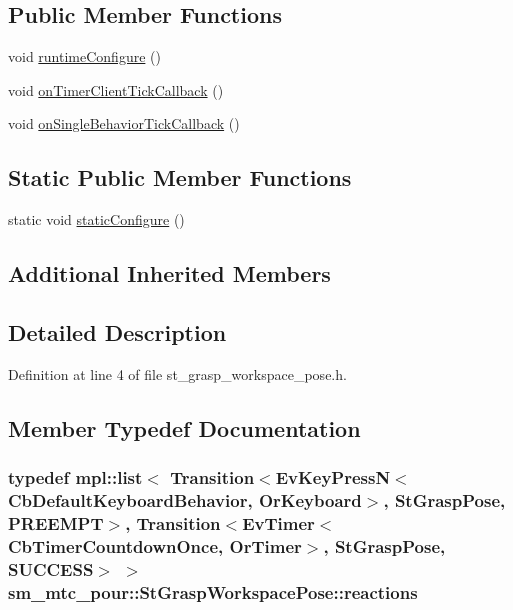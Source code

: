 \subsection*{Public Member Functions}
\begin{DoxyCompactItemize}
\item 
void \hyperlink{structsm__mtc__pour_1_1StGraspWorkspacePose_afcf41d71341af7a0c5382e2f5da3554a}{runtime\+Configure} ()
\item 
void \hyperlink{structsm__mtc__pour_1_1StGraspWorkspacePose_af10f597278e9e5afdeefd6f91d99d3ab}{on\+Timer\+Client\+Tick\+Callback} ()
\item 
void \hyperlink{structsm__mtc__pour_1_1StGraspWorkspacePose_a3cefea40047bb2ebcff455d2230485d4}{on\+Single\+Behavior\+Tick\+Callback} ()
\end{DoxyCompactItemize}
\subsection*{Static Public Member Functions}
\begin{DoxyCompactItemize}
\item 
static void \hyperlink{structsm__mtc__pour_1_1StGraspWorkspacePose_ae59939c0fb7a83119a13395fe2c81bd7}{static\+Configure} ()
\end{DoxyCompactItemize}
\subsection*{Additional Inherited Members}


\subsection{Detailed Description}


Definition at line 4 of file st\+\_\+grasp\+\_\+workspace\+\_\+pose.\+h.



\subsection{Member Typedef Documentation}
\subsubsection[{\texorpdfstring{reactions}{reactions}}]{\setlength{\rightskip}{0pt plus 5cm}typedef mpl\+::list$<$ Transition$<$Ev\+Key\+PressN$<$Cb\+Default\+Keyboard\+Behavior, {\bf Or\+Keyboard}$>$, {\bf St\+Grasp\+Pose}, {\bf P\+R\+E\+E\+M\+PT}$>$, Transition$<$Ev\+Timer$<$Cb\+Timer\+Countdown\+Once, {\bf Or\+Timer}$>$, {\bf St\+Grasp\+Pose}, {\bf S\+U\+C\+C\+E\+SS}$>$ $>$ {\bf sm\+\_\+mtc\+\_\+pour\+::\+St\+Grasp\+Workspace\+Pose\+::reactions}}\hypertarget{structsm__mtc__pour_1_1StGraspWorkspacePose_a3f268472d0bf5bd8f233d25052275c2a}{}\label{structsm__mtc__pour_1_1StGraspWorkspacePose_a3f268472d0bf5bd8f233d25052275c2a}


